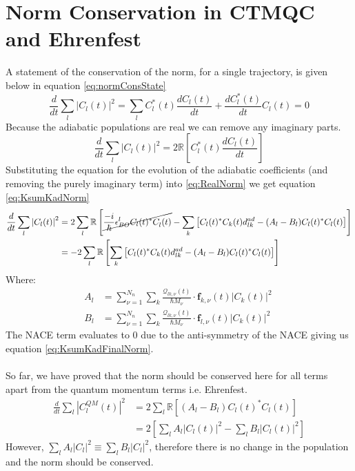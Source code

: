 \chapter{Norm Conservation in CTMQC and Ehrenfest}
\label{ap:norm_cons}
A statement of the conservation of the norm, for a single trajectory, is given below in equation \eqref{eq:normConsState}
\begin{equation}
	\frac{d}{dt} \sum_{l} \left\vert C_{l}(t) \right\vert^2 = \sum_{l} C_{l}^{*}(t)\frac{d C_{l}(t)}{dt} + \frac{d C_{l}^{*}(t)}{dt}C_{l}(t)
	\label{eq:normConsState} = 0
\end{equation}
Because the adiabatic populations are real we can remove any imaginary parts.
\begin{equation}
	\frac{d}{dt} \sum_{l} \left\vert C_{l}(t) \right\vert^2 = 2 \mathbb{R} \left[ C_{l}^{*}(t) \frac{d C_{l}(t)}{dt} \right]
	\label{eq:RealNorm}
\end{equation}
Substituting the equation for the evolution of the adiabatic coefficients (and removing the purely imaginary term) into \eqref{eq:RealNorm} we get equation \eqref{eq:KsumKadNorm}
\begin{align}
	\frac{d}{dt} \sum_{l} \left\vert C_{l}(t) \right\vert^2 &= 2 \sum_{l} \mathbb{R} \left[ \cancel{\frac{-i}{\hbar} \epsilon_{BO}^{l} C_l(t)^*C_l^{}(t)}
	- \sum_{k} \left[ C_l(t)^*C_k(t) d_{lk}^{ad} - (A_l - B_{l}) C_l(t)^*C_l(t)  \right] \right]
	\\
	&= -2 \sum_{l} \mathbb{R} \left[ \sum_{k} \left[ C_l(t)^*C_k(t) d_{lk}^{ad} - (A_l - B_{l}) C_l(t)^*C_l(t)  \right] \right]
	\label{eq:KsumKadNorm}
\end{align}
Where:
\begin{align}
	A_{l} &= \sum_{\nu = 1}^{N_n} \sum_{k} \frac{\mathcal{Q}_{lk, \nu}(t)}{\hbar M_\nu}\cdot \mathbf{f}_{k, \nu}(t) \vert C_k(t) \vert^2 \ \\
	B_{l} &= \sum_{\nu = 1}^{N_n} \sum_{k} \frac{\mathcal{Q}_{lk, \nu}(t)}{\hbar M_\nu}\cdot \mathbf{f}_{l, \nu}(t) \vert C_{k}(t)\vert^2
\end{align}
The NACE term evaluates to 0 due to the anti-symmetry of the NACE giving us equation \eqref{eq:KsumKadFinalNorm}. 
\\\\
So far, we have proved that the norm should be conserved here for all terms apart from the quantum momentum terms i.e. Ehrenfest.
\begin{align}
	\frac{d}{dt} \sum_{l} \left\vert C^{QM}_{l}(t) \right\vert^2 &= 2 \sum_{l} \mathbb{R} \left[ (A_l - B_{l}) C_l(t)^*C_l(t)  \right] \\
	&= 2 \left[ \sum_l A_l |C_{l}(t)|^2 - \sum_{l} B_{l} \vert C_{l}(t) \vert^2 \right]
	\label{eq:KsumKadFinalNorm}
\end{align}
However, $\sum_{l}A_l |C_{l}|^2 \equiv \sum_{l} B_{l} |C_{l}|^2$, therefore there is no change in the population and the norm should be conserved.
\newpage
